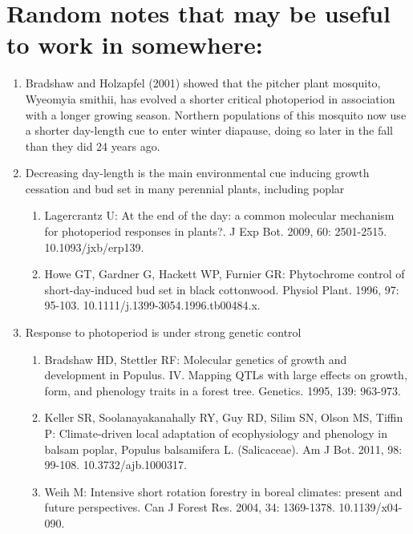 \documentclass{article}
\begin{document}
\section* {Random notes that may be useful to work in somewhere:}
\begin {enumerate}
\item Bradshaw and Holzapfel (2001) showed that the pitcher plant mosquito,
Wyeomyia smithii, has evolved a shorter critical photoperiod in association with a
longer growing season. Northern populations of this mosquito now use a shorter
day-length cue to enter winter diapause, doing so later in the fall than they did
24 years ago.
\item Decreasing day-length is the main environmental cue inducing growth cessation and bud set in many perennial plants, including poplar 
\begin{enumerate}

\item Lagercrantz U: At the end of the day: a common molecular mechanism for photoperiod responses in plants?. J Exp Bot. 2009, 60: 2501-2515. 10.1093/jxb/erp139.
\item Howe GT, Gardner G, Hackett WP, Furnier GR: Phytochrome control of short-day-induced bud set in black cottonwood. Physiol Plant. 1996, 97: 95-103. 10.1111/j.1399-3054.1996.tb00484.x.
\end{enumerate}

\item Response to photoperiod is under strong genetic control 
\begin{enumerate}
\item Bradshaw HD, Stettler RF: Molecular genetics of growth and development in Populus. IV. Mapping QTLs with large effects on growth, form, and phenology traits in a forest tree. Genetics. 1995, 139: 963-973.
\item Keller SR, Soolanayakanahally RY, Guy RD, Silim SN, Olson MS, Tiffin P: Climate-driven local adaptation of ecophysiology and phenology in balsam poplar, Populus balsamifera L. (Salicaceae). Am J Bot. 2011, 98: 99-108. 10.3732/ajb.1000317.
\item Weih M: Intensive short rotation forestry in boreal climates: present and future perspectives. Can J Forest Res. 2004, 34: 1369-1378. 10.1139/x04-090.
\end{enumerate}
\end {enumerate}

\clearpage
\end{document}
